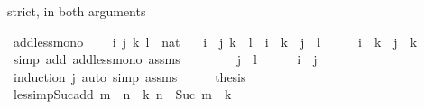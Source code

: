 \begin{isabellebody}
\endisatagproof
{\isafoldproof}%
%
\isadelimproof
%
\endisadelimproof
%
\begin{isamarkuptext}%
strict, in both arguments%
\end{isamarkuptext}\isamarkuptrue%
\isamarkupfalse%
\ add{\isacharunderscore}{\kern0pt}less{\isacharunderscore}{\kern0pt}mono{\isacharcolon}{\kern0pt}\ \isanewline
\ \ \ i\ j\ k\ l\ {\isacharcolon}{\kern0pt}{\isacharcolon}{\kern0pt}\ nat\isanewline
\ \ \ {\isachardoublequoteopen}i\ {\isacharless}{\kern0pt}\ j{\isachardoublequoteclose}\ {\isachardoublequoteopen}k\ {\isacharless}{\kern0pt}\ l{\isachardoublequoteclose}\ \ {\isachardoublequoteopen}i\ {\isacharplus}{\kern0pt}\ k\ {\isacharless}{\kern0pt}\ j\ {\isacharplus}{\kern0pt}\ l{\isachardoublequoteclose}\isanewline
%
\isadelimproof
%
\endisadelimproof
%
\isatagproof
{}\isamarkupfalse%
\ {\isacharminus}{\kern0pt}\isanewline
\ \ \isamarkupfalse%
\ {\isachardoublequoteopen}i\ {\isacharplus}{\kern0pt}\ k\ {\isacharless}{\kern0pt}\ j\ {\isacharplus}{\kern0pt}\ k{\isachardoublequoteclose}\isanewline
\ \ \ \ \isamarkupfalse%
\ {\isacharparenleft}{\kern0pt}simp\ add{\isacharcolon}{\kern0pt}\ add{\isacharunderscore}{\kern0pt}less{\isacharunderscore}{\kern0pt}mono{}\ assms{\isacharparenright}{\kern0pt}\isanewline
\ \ \isamarkupfalse%
\ \isamarkupfalse%
\ {\isachardoublequoteopen}{\isachardot}{\kern0pt}{\isachardot}{\kern0pt}{\isachardot}{\kern0pt}\ \ {\isacharless}{\kern0pt}\ j\ {\isacharplus}{\kern0pt}\ l{\isachardoublequoteclose}\isanewline
\ \ \ \ \isamarkupfalse%
\ {\isacartoucheopen}i\ {\isacharless}{\kern0pt}\ j{\isacartoucheclose}\ \isamarkupfalse%
\ {\isacharparenleft}{\kern0pt}induction\ j{\isacharparenright}{\kern0pt}\ {\isacharparenleft}{\kern0pt}auto\ simp{\isacharcolon}{\kern0pt}\ assms{\isacharparenright}{\kern0pt}\isanewline
\ \ \isamarkupfalse%
\ \isamarkupfalse%
\ {\isacharquery}{\kern0pt}thesis\ \isacommand{{\isachardot}{\kern0pt}}\isamarkupfalse%
\isanewline
{}\isamarkupfalse%
%
\endisatagproof
{\isafoldproof}%
%
\isadelimproof
\isanewline
%
\endisadelimproof
\isanewline
{}\isamarkupfalse%
\ less{\isacharunderscore}{\kern0pt}imp{\isacharunderscore}{\kern0pt}Suc{\isacharunderscore}{\kern0pt}add{\isacharcolon}{\kern0pt}\ {\isachardoublequoteopen}m\ {\isacharless}{\kern0pt}\ n\ {\isasymLongrightarrow}\ {\isasymexists}k{\isachardot}{\kern0pt}\ n\ {\isacharequal}{\kern0pt}\ Suc\ {\isacharparenleft}{\kern0pt}m\ {\isacharplus}{\kern0pt}\ k{\isacharparenright}{\kern0pt}{\isachardoublequoteclose}\isanewline

\end{isabellebody}
